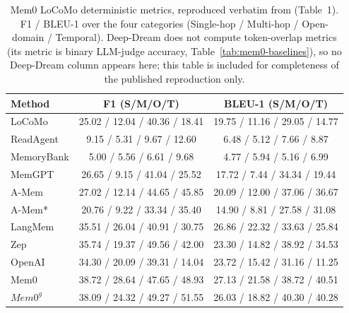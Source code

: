 \begin{table}[t]
\centering
\caption{Mem0 LoCoMo deterministic metrics, reproduced verbatim from \citet{chhikara2025mem0} (Table~1). F1 / BLEU-1 over the four categories (Single-hop / Multi-hop / Open-domain / Temporal). Deep-Dream does not compute token-overlap metrics (its metric is binary LLM-judge accuracy, Table~\ref{tab:mem0-baselines}), so no Deep-Dream column appears here; this table is included for completeness of the published reproduction only.}
\label{tab:mem0-f1-bleu}
\footnotesize
\setlength{\tabcolsep}{4pt}
\begin{tabular}{lcc}
\toprule
Method & F1 (S/M/O/T) & BLEU-1 (S/M/O/T) \\
\midrule
LoCoMo & 25.02 / 12.04 / 40.36 / 18.41 & 19.75 / 11.16 / 29.05 / 14.77 \\
ReadAgent & 9.15 / 5.31 / 9.67 / 12.60 & 6.48 / 5.12 / 7.66 / 8.87 \\
MemoryBank & 5.00 / 5.56 / 6.61 / 9.68 & 4.77 / 5.94 / 5.16 / 6.99 \\
MemGPT & 26.65 / 9.15 / 41.04 / 25.52 & 17.72 / 7.44 / 34.34 / 19.44 \\
A-Mem & 27.02 / 12.14 / 44.65 / 45.85 & 20.09 / 12.00 / 37.06 / 36.67 \\
A-Mem* & 20.76 / 9.22 / 33.34 / 35.40 & 14.90 / 8.81 / 27.58 / 31.08 \\
LangMem & 35.51 / 26.04 / 40.91 / 30.75 & 26.86 / 22.32 / 33.63 / 25.84 \\
Zep & 35.74 / 19.37 / 49.56 / 42.00 & 23.30 / 14.82 / 38.92 / 34.53 \\
OpenAI & 34.30 / 20.09 / 39.31 / 14.04 & 23.72 / 15.42 / 31.16 / 11.25 \\
Mem0 & 38.72 / 28.64 / 47.65 / 48.93 & 27.13 / 21.58 / 38.72 / 40.51 \\
$Mem0^g$ & 38.09 / 24.32 / 49.27 / 51.55 & 26.03 / 18.82 / 40.30 / 40.28 \\
\bottomrule
\end{tabular}
\end{table}
